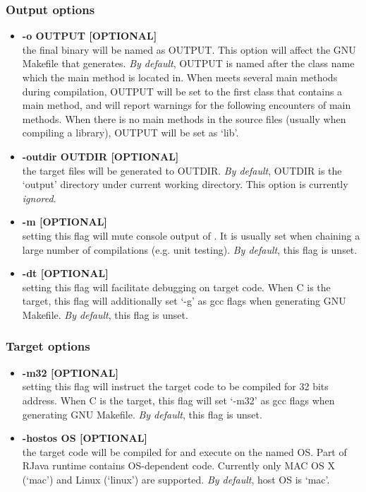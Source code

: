 \documentclass[12pt]{article}
\begin{document}
\subsubsection*{Output options}
\begin{itemize}
\item
\textbf{-o OUTPUT [OPTIONAL] \\}
the final binary will be named as OUTPUT. This option will affect the GNU
Makefile that \rjc generates. \emph{By default}, OUTPUT is named after
the class name which the main method is located in. When \rjc meets
several main methods during compilation, OUTPUT will be set to
the first class that contains a main method, and \rjc will report warnings
for the following encounters of main methods. When there is no main 
methods in the source files (usually when compiling a library), OUTPUT
will be set as `lib'. 
\item
\textbf{-outdir OUTDIR [OPTIONAL] \\}
the target files will be generated to OUTDIR. \emph{By default}, OUTDIR
is the `output' directory under current working directory. This option is
currently \emph{ignored}. 
\item
\textbf{-m [OPTIONAL] \\}
setting this flag will mute console output of \rjc. It is usually set when
chaining a large number of compilations (e.g. unit testing). 
\emph{By default}, this flag is unset. 
\item
\textbf{-dt [OPTIONAL] \\}
setting this flag will facilitate debugging on target code. 
When C is the target, this flag will additionally set `-g' as gcc flags when 
generating GNU Makefile. \emph{By default}, this flag is unset. 
\end{itemize}

\subsubsection*{Target options}
\begin{itemize}
\item
\textbf{-m32 [OPTIONAL]\\}
setting this flag will instruct the target code to be compiled for
32 bits address. When C is the target, this flag will set `-m32'
as gcc flags when generating GNU Makefile. 
\emph{By default}, this flag is unset. 
\item
\textbf{-host\textunderscore os OS [OPTIONAL]\\}
the target code will be compiled for and execute on the
named OS. 
Part of RJava runtime contains OS-dependent code. 
Currently only MAC OS X (`mac') and Linux (`linux') are
supported. \emph{By default}, host OS is `mac'. 
\end{itemize}
\end{document}
